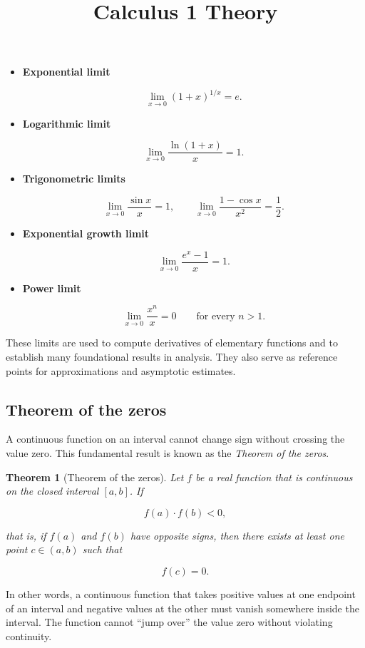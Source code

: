 \documentclass[11pt,a4paper]{article} \usepackage[T1]{fontenc}
\theoremstyle{plain} \newtheorem{theorem}{Theorem} \title{Calculus 1 Theory}
\begin{document}
\begin{itemize}
\item \textbf{Exponential limit}

\[
\lim_{x \to 0} (1+x)^{1/x} = e.
\]

\item \textbf{Logarithmic limit}

\[
\lim_{x \to 0} \frac{\ln(1+x)}{x} = 1.
\]

\item \textbf{Trigonometric limits}

\[
\lim_{x \to 0} \frac{\sin x}{x} = 1,
\qquad
\lim_{x \to 0} \frac{1 - \cos x}{x^2} = \frac{1}{2}.
\]

\item \textbf{Exponential growth limit}

\[
\lim_{x \to 0} \frac{e^x - 1}{x} = 1.
\]

\item \textbf{Power limit}

\[
\lim_{x \to 0} \frac{x^n}{x} = 0 \qquad \text{for every } n>1.
\]

\end{itemize}

These limits are used to compute derivatives of elementary functions and to
establish many foundational results in analysis. They also serve as reference
points for approximations and asymptotic estimates.

\subsection{Theorem of the zeros}

A continuous function on an interval cannot change sign without crossing the
value zero. This fundamental result is known as the \emph{Theorem of the
zeros}.

\begin{theorem}
[Theorem of the zeros] Let $f$ be a real function that is continuous on the
closed interval $[a,b]$. If

\[
f(a)\cdot f(b) < 0,
\]

that is, if $f(a)$ and $f(b)$ have opposite signs, then there exists at least
one point $c \in (a,b)$ such that

\[
f(c) = 0.
\]

\end{theorem}

In other words, a continuous function that takes positive values at one
endpoint of an interval and negative values at the other must vanish somewhere
inside the interval. The function cannot “jump over” the value zero without
violating continuity.
\end{document}
